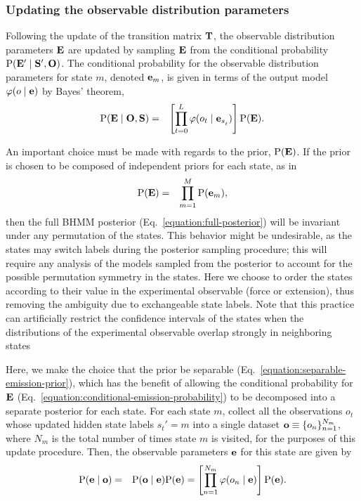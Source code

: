 \documentclass[aps,pre,twocolumn,superscriptaddress,nofootinbib,longbibliography]{revtex4-1}
\newcommand{\bfm}[1]{{\bf #1}}
\renewcommand{\Pr}{\mathrm{P}}
\begin{document}
{%
\subsubsection{Updating the observable distribution parameters}

Following the update of the transition matrix $\bfm{T}$, the observable distribution parameters $\bfm{E}$ are updated by sampling $\bfm{E}$ from the conditional probability $\Pr(\bfm{E}' \mid \bfm{S}', \bfm{O})$.
The conditional probability for the observable distribution parameters for state $m$, denoted $\bfm{e}_m$, is given in terms of the output model $\varphi(o \mid \bfm{e})$ by Bayes' theorem,
\begin{eqnarray}
\Pr(\bfm{E} \mid \bfm{O}, \bfm{S}) &=& \left[\prod_{t=0}^{L^{}} \varphi(o_{t} \mid \bfm{e}_{s^{}_{t}}) \right] \Pr(\bfm{E}) \label{equation:conditional-emission-probability} .
\end{eqnarray}

An important choice must be made with regards to the prior, $\Pr(\bfm{E})$.
If the prior is chosen to be composed of independent priors for each state, as in
\begin{eqnarray}
\Pr(\bfm{E}) &=& \prod_{m=1}^M \Pr(\bfm{e}_m) \label{equation:separable-emission-prior} ,
\end{eqnarray}
then the full BHMM posterior (Eq.~\ref{equation:full-posterior}) will be invariant under any permutation of the states.
This behavior might be undesirable, as the states may switch labels during the posterior sampling procedure; this will require any analysis of the models sampled from the posterior to account for the possible permutation symmetry in the states.
{\color{magenta}Here we choose to order the states according to their value in the experimental observable (force or extension), thus removing
the ambiguity due to exchangeable state labels. Note that this practice can artificially restrict the confidence intervals of the states when 
the distributions of the experimental observable overlap strongly in neighboring states}


Here, we make the choice that the prior be separable (Eq.~\ref{equation:separable-emission-prior}), which has the benefit of allowing the conditional probability for $\bfm{E}$ (Eq.~\ref{equation:conditional-emission-probability}) to be decomposed into a separate posterior for each state.
For each state $m$, collect all the observations $o^{}_{t}$ whose updated hidden state labels ${s^{}_{t}}' = m$ into a single dataset $\bfm{o} \equiv \{o_n\}_{n=1}^{N_m}$, where $N_m$ is the total number of times state $m$ is visited, for the purposes of this update procedure.
Then, the observable parameters $\bfm{e}$ for this state are given by
\begin{eqnarray}
\Pr(\bfm{e} \mid \bfm{o}) &=& \Pr(\bfm{o} \mid \bfm{e}) \Pr(\bfm{e}) = \left[ \prod_{n=1}^{N_m} \varphi(o_n \mid \bfm{e}) \right] \Pr(\bfm{e}) .
\end{eqnarray}

}
\end{document}
